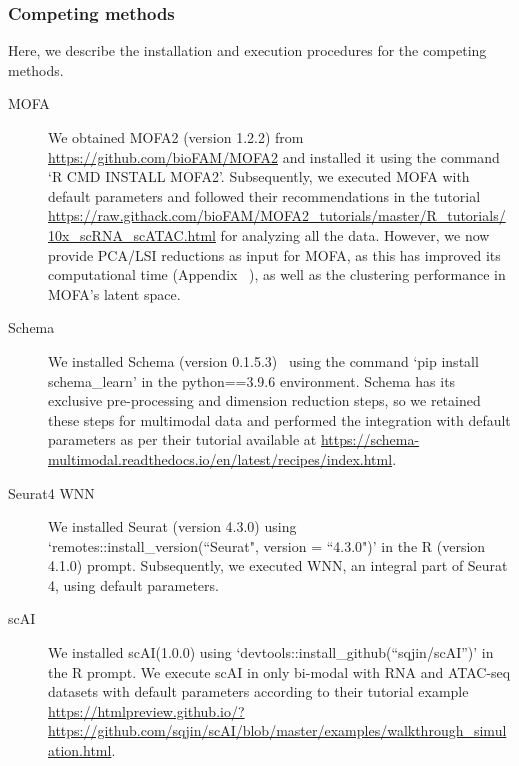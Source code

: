 \subsubsection{Competing methods}
\label{MOJITOO:exp:methods}
Here, we describe the installation and execution procedures for the competing methods.
\begin{description}
    \item[MOFA] 
    We obtained MOFA2 (version 1.2.2)\citep{tewari2017mofa} from \href{https://github.com/bioFAM/MOFA2}{https://github.com/bioFAM/MOFA2} and installed it using the command `R CMD INSTALL MOFA2'. Subsequently, we executed MOFA with default parameters and followed their recommendations in the tutorial \url{https://raw.githack.com/bioFAM/MOFA2_tutorials/master/R_tutorials/10x_scRNA_scATAC.html} for analyzing all the data. However, we now provide PCA/LSI reductions as input for MOFA, as this has improved its computational time (Appendix ~), as well as the clustering performance in MOFA's latent space.
    
    \item[Schema]
    We installed Schema (version 0.1.5.3)~\cite{singh2021schema} using the command `pip install schema\_learn' in the python==3.9.6 environment. Schema has its exclusive pre-processing and dimension reduction steps, so we retained these steps for multimodal data and performed the integration with default parameters as per their tutorial available at \url{https://schema-multimodal.readthedocs.io/en/latest/recipes/index.html}.
    
    \item[Seurat4 WNN]
    We installed Seurat (version 4.3.0) using `remotes::install\_version(``Seurat", version = ``4.3.0")' in the R (version 4.1.0) prompt. Subsequently, we executed WNN, an integral part of Seurat 4, using default parameters. 
    
    \item[scAI]
    We installed scAI(1.0.0) using `devtools::install\_github(``sqjin/scAI'')' in the R prompt. We execute scAI in only bi-modal with RNA and ATAC-seq datasets with default parameters according to their tutorial example \url{https://htmlpreview.github.io/?https://github.com/sqjin/scAI/blob/master/examples/walkthrough_simulation.html}.
    

\end{description}
